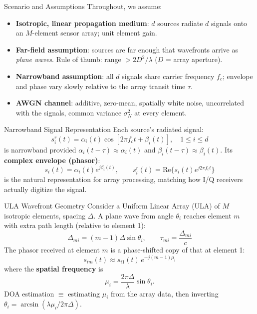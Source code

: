 \documentclass[10pt,aspectratio=169]{beamer}
\begin{document}
\begin{frame}{Scenario and Assumptions}
Throughout, we assume:
\begin{itemize}
	\item \textbf{Isotropic, linear propagation medium}: $d$ sources radiate $d$ signals onto an $M$-element sensor array; unit element gain.
	\item \textbf{Far-field assumption}: sources are far enough that wavefronts arrive as \emph{plane waves}. Rule of thumb: range $> 2D^2/\lambda$ ($D$ = array aperture).
	\item \textbf{Narrowband assumption}: all $d$ signals share carrier frequency $f_c$; envelope and phase vary slowly relative to the array transit time $\tau$.
	\item \textbf{AWGN channel}: additive, zero-mean, spatially white noise, uncorrelated with the signals, common variance $\sigma_N^2$ at every element.
\end{itemize}
\end{frame}

\begin{frame}{Narrowband Signal Representation}
Each source's radiated signal:
\begin{equation}
	s_i^r(t) = \alpha_i(t)\cos[2\pi f_c t + \beta_i(t)], \quad 1 \le i \le d
	\label{eq:3-1}
\end{equation}
is narrowband provided $\alpha_i(t-\tau)\approx \alpha_i(t)$ and $\beta_i(t-\tau)\approx\beta_i(t)$. Its \textbf{complex envelope (phasor)}:
\begin{equation}
	s_i(t) = \alpha_i(t)e^{j\beta_i(t)}, \qquad s_i^r(t) = \mathrm{Re}\{s_i(t)e^{j2\pi f_c t}\}
	\label{eq:3-3}
\end{equation}
is the natural representation for array processing, matching how I/Q receivers actually digitize the signal.
\end{frame}

\begin{frame}{ULA Wavefront Geometry}
Consider a Uniform Linear Array (ULA) of $M$ isotropic elements, spacing $\Delta$. A plane wave from angle $\theta_i$ reaches element $m$ with extra path length (relative to element 1):
\begin{equation}
	\Delta_{mi} = (m-1)\Delta\sin\theta_i, \qquad \tau_{mi} = \frac{\Delta_{mi}}{c}
	\label{eq:3-5}
\end{equation}
The phasor received at element $m$ is a phase-shifted copy of that at element 1:
\begin{equation}
	s_{im}(t) \approx s_{i1}(t)\,e^{-j(m-1)\mu_i}
	\label{eq:3-8}
\end{equation}
where the \textbf{spatial frequency} is
\begin{equation}
	\mu_i = \frac{2\pi\Delta}{\lambda}\sin\theta_i .
\end{equation}
DOA estimation $\equiv$ estimating $\mu_i$ from the array data, then inverting $\theta_i = \arcsin(\lambda\mu_i/2\pi\Delta)$.
\end{frame}
\end{document}
